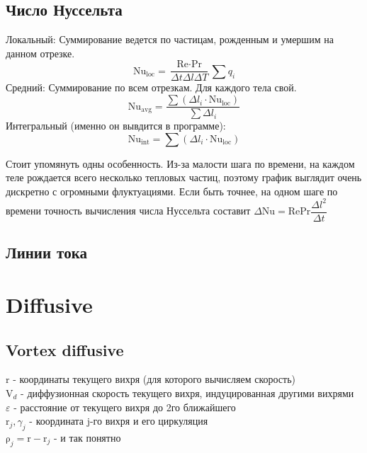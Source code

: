 \documentclass[14pt]{extreport}
\newcommand{\br}[1]{\boldsymbol{\mathrm{#1}}}
\newcommand{\Reyn}{\text{Re}}
\newcommand{\Pran}{\text{Pr}}
\newcommand{\Nuss}{\text{Nu}}
\begin{document}
\subsection{Число Нуссельта}

Локальный: Суммирование ведется по частицам, рожденным и умершим на данном отрезке.
$$\Nuss_\text{loc} = \dfrac{\Reyn \cdot \Pran}{\Delta t \Delta l \Delta T} \sum q_i$$
Средний: Суммирование по всем отрезкам. Для каждого тела свой.
$$\Nuss_\text{avg} = \dfrac{\sum (\Delta l_i \cdot \Nuss_\text{loc})}{\sum \Delta l_i}$$
Интегральный (именно он вывдится в программе):
$$\Nuss_\text{int} = \sum ( \Delta l_i \cdot \Nuss_\text{loc})$$

Стоит упомянуть одны особенность. Из-за малости шага по времени, на каждом теле рождается всего несколько тепловых частиц, поэтому график выглядит очень дискретно с огромными флуктуациями. Если быть точнее, на одном шаге по времени точность вычисления числа Нуссельта составит $\Delta \Nuss = \Reyn \Pran \dfrac{\Delta l^2}{\Delta t }$


\subsection{Линии тока}


\newpage
\section{Diffusive}
\subsection{Vortex diffusive}

$\br r$ - координаты текущего вихря (для которого вычисляем скорость) \\
$\br V_d$ - диффузионная скорость текущего вихря, индуцированная другими вихрями \\
$\varepsilon$ - расстояние от текущего вихря до 2го ближайшего \\
$\br r_j, \gamma_j$ - координата j-го вихря и его циркуляция \\
$\br\rho_j = \br r - \br r_j$ - и так понятно \\
\end{document}
